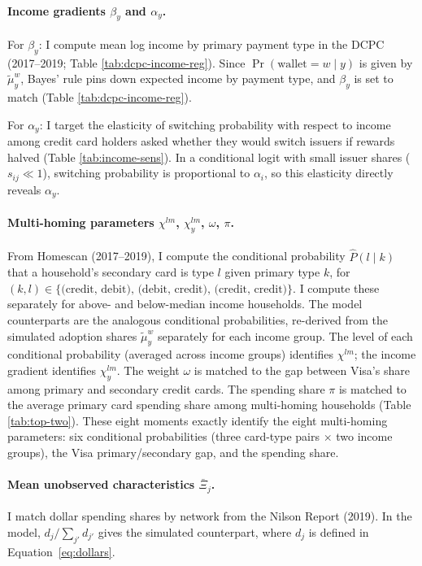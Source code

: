 \documentclass[main.tex]{subfiles}
\begin{document}
\paragraph{Income gradients $\beta_y$ and $\alpha_y$.} For $\beta_y$: I compute mean log income by primary payment type in the DCPC (2017--2019; Table \ref{tab:dcpc-income-reg}).
Since $\Pr(\text{wallet} = w \mid y)$ is given by $\tilde{\mu}^w_y$, Bayes' rule pins down expected income by payment type, and $\beta_y$ is set to match (Table \ref{tab:dcpc-income-reg}).

For $\alpha_y$: I target the elasticity of switching probability with respect to income among credit card holders asked whether they would switch issuers if rewards halved (Table \ref{tab:income-sens}).
In a conditional logit with small issuer shares ($s_{ij} \ll 1$), switching probability is proportional to $\alpha_i$, so this elasticity directly reveals $\alpha_y$.

\paragraph{Multi-homing parameters $\chi^{lm}$, $\chi^{lm}_y$, $\omega$, $\pi$.} From Homescan (2017--2019), I compute the conditional probability $\hat{P}(l \mid k)$ that a household's secondary card is type $l$ given primary type $k$, for $(k, l) \in \{\text{(credit, debit), (debit, credit), (credit, credit)}\}$. I compute these separately for above- and below-median income households. The model counterparts are the analogous conditional probabilities, re-derived from the simulated adoption shares $\tilde{\mu}^w_y$ separately for each income group.
The level of each conditional probability (averaged across income groups) identifies $\chi^{lm}$; the income gradient identifies $\chi^{lm}_y$.
The weight $\omega$ is matched to the gap between Visa's share among primary and secondary credit cards.
The spending share $\pi$ is matched to the average primary card spending share among multi-homing households (Table \ref{tab:top-two}).
These eight moments exactly identify the eight multi-homing parameters: six conditional probabilities (three card-type pairs $\times$ two income groups), the Visa primary/secondary gap, and the spending share.

\paragraph{Mean unobserved characteristics $\bar{\Xi}_j$.} I match dollar spending shares by network from the Nilson Report (2019).
In the model, $d_j / \sum_{j'} d_{j'}$ gives the simulated counterpart, where $d_j$ is defined in Equation~\ref{eq:dollars}.
\end{document}

